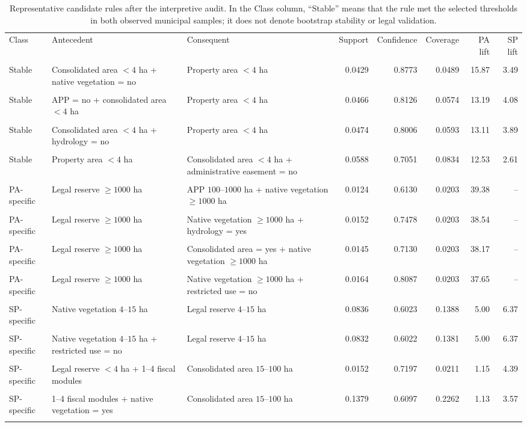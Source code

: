 \documentclass[11pt]{article}
\begin{document}
\begin{table}[t]
\centering
\scriptsize
\caption{Representative candidate rules after the interpretive audit. In the Class column, ``Stable'' means that the rule met the selected thresholds in both observed municipal samples; it does not denote bootstrap stability or legal validation.}
\label{tab:candidates}
\begin{tabularx}{\textwidth}{p{}X X r r r r r}
\toprule
Class & Antecedent & Consequent & Support & Confidence & Coverage & PA lift & SP lift \\\\
\midrule
Stable & Consolidated area $<4$ ha + native vegetation = no & Property area $<4$ ha & 0.0429 & 0.8773 & 0.0489 & 15.87 & 3.49 \\\\
Stable & APP = no + consolidated area $<4$ ha & Property area $<4$ ha & 0.0466 & 0.8126 & 0.0574 & 13.19 & 4.08 \\\\
Stable & Consolidated area $<4$ ha + hydrology = no & Property area $<4$ ha & 0.0474 & 0.8006 & 0.0593 & 13.11 & 3.89 \\\\
Stable & Property area $<4$ ha & Consolidated area $<4$ ha + administrative easement = no & 0.0588 & 0.7051 & 0.0834 & 12.53 & 2.61 \\\\
PA-specific & Legal reserve $\geq1000$ ha & APP $100$--$1000$ ha + native vegetation $\geq1000$ ha & 0.0124 & 0.6130 & 0.0203 & 39.38 & -- \\\\
PA-specific & Legal reserve $\geq1000$ ha & Native vegetation $\geq1000$ ha + hydrology = yes & 0.0152 & 0.7478 & 0.0203 & 38.54 & -- \\\\
PA-specific & Legal reserve $\geq1000$ ha & Consolidated area = yes + native vegetation $\geq1000$ ha & 0.0145 & 0.7130 & 0.0203 & 38.17 & -- \\\\
PA-specific & Legal reserve $\geq1000$ ha & Native vegetation $\geq1000$ ha + restricted use = no & 0.0164 & 0.8087 & 0.0203 & 37.65 & -- \\\\
SP-specific & Native vegetation $4$--$15$ ha & Legal reserve $4$--$15$ ha & 0.0836 & 0.6023 & 0.1388 & 5.00 & 6.37 \\\\
SP-specific & Native vegetation $4$--$15$ ha + restricted use = no & Legal reserve $4$--$15$ ha & 0.0832 & 0.6022 & 0.1381 & 5.00 & 6.37 \\\\
SP-specific & Legal reserve $<4$ ha + 1--4 fiscal modules & Consolidated area $15$--$100$ ha & 0.0152 & 0.7197 & 0.0211 & 1.15 & 4.39 \\\\
SP-specific & 1--4 fiscal modules + native vegetation = yes & Consolidated area $15$--$100$ ha & 0.1379 & 0.6097 & 0.2262 & 1.13 & 3.57 \\\\
\bottomrule
\end{tabularx}
\end{table}
\end{document}
